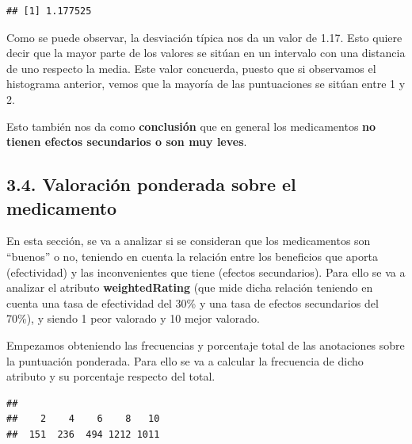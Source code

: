 \documentclass[spanish,]{article}
\newenvironment{Shaded}{\begin{snugshade}}{\end{snugshade}}
\newcommand{\KeywordTok}[1]{\textcolor[rgb]{0.13,0.29,0.53}{\textbf{#1}}}
\newcommand{\DecValTok}[1]{\textcolor[rgb]{0.00,0.00,0.81}{#1}}
\newcommand{\StringTok}[1]{\textcolor[rgb]{0.31,0.60,0.02}{#1}}
\newcommand{\CommentTok}[1]{\textcolor[rgb]{0.56,0.35,0.01}{\textit{#1}}}
\newcommand{\OperatorTok}[1]{\textcolor[rgb]{0.81,0.36,0.00}{\textbf{#1}}}
\newcommand{\NormalTok}[1]{#1}
\begin{document}
\begin{verbatim}
## [1] 1.177525
\end{verbatim}

Como se puede observar, la desviación típica nos da un valor de 1.17.
Esto quiere decir que la mayor parte de los valores se sitúan en un
intervalo con una distancia de uno respecto la media. Este valor
concuerda, puesto que si observamos el histograma anterior, vemos que la
mayoría de las puntuaciones se sitúan entre 1 y 2.

Esto también nos da como \textbf{conclusión} que en general los
medicamentos \textbf{no tienen efectos secundarios o son muy leves}.

\subsection{3.4. Valoración ponderada sobre el
medicamento}\label{valoracion-ponderada-sobre-el-medicamento}

En esta sección, se va a analizar si se consideran que los medicamentos
son ``buenos'' o no, teniendo en cuenta la relación entre los beneficios
que aporta (efectividad) y las inconvenientes que tiene (efectos
secundarios). Para ello se va a analizar el atributo
\textbf{weightedRating} (que mide dicha relación teniendo en cuenta una
tasa de efectividad del 30\% y una tasa de efectos secundarios del
70\%), y siendo 1 peor valorado y 10 mejor valorado.

Empezamos obteniendo las frecuencias y porcentaje total de las
anotaciones sobre la puntuación ponderada. Para ello se va a calcular la
frecuencia de dicho atributo y su porcentaje respecto del total.

\begin{Shaded}
\end{Shaded}

\begin{verbatim}
## 
##    2    4    6    8   10 
##  151  236  494 1212 1011
\end{verbatim}

\begin{Shaded}
\end{Shaded}
\end{document}
